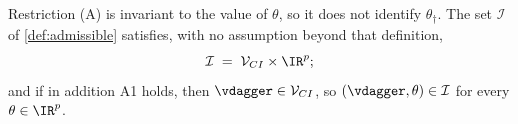 %
%


\begin{lemma}\label{lem:shiftinv}
Restriction (A) is invariant to the value of $\theta$, so it does not identify $\theta_\dagger$.
The set $\mathcal I$ of \cref{def:admissible} satisfies, with no assumption beyond that definition,
\begin{equation}\label{eq:shiftinv}
\mathcal I\;=\;\mathcal V_{CI}\times\IR^{p};
\end{equation}
and if in addition A1 holds, then $\vdagger\in\mathcal V_{CI}$, so $(\vdagger,\theta)\in\mathcal I$ for
every $\theta\in\IR^{p}$.
\end{lemma}


